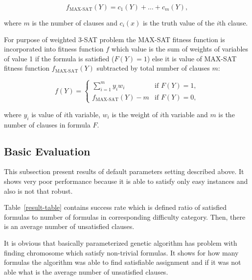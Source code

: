 \documentclass{article}
\begin{document}
$$f_{\text{MAX-SAT}}(Y) = c_1(Y) + \dots + c_m(Y),$$

where $m$ is the number of clauses and $c_i(x)$ is the truth value of the $i$th
clause.

For purpose of weighted 3-SAT problem the MAX-SAT fitness function is
incorporated into fitness function $f$
which value is the sum of weights of variables of value 1
if the formula is satisfied ($F(Y) = 1$)
else it is value of MAX-SAT fitness function $f_{\text{MAX-SAT}}(Y)$
subtracted by total number of clauses $m$:

$$
f(Y) = 
\begin{cases} 
    \sum_{i = 1}^m y_i w_i & \text{if } F(Y) = 1, \\
    f_{\text{MAX-SAT}}(Y) - m & \text{if } F(Y) = 0,
\end{cases}
$$

where $y_i$ is value of $i$th variable, $w_i$ is the weight of $i$th
variable and $m$ is the number of clauses in formula $F$.

\subsection{Basic Evaluation}
\label{sec:basic}

This subsection present results of default parameters setting described above.
It shows very poor performance
because it is able to satisfy only easy instances
and also is not that robust.

Table~\ref{result-table} contains success rate which is defined ratio
of satisfied formulas to number of formulas
in corresponding difficulty category.
Then, there is an average number of unsatisfied clauses.

It is obvious that basically parameterized genetic algorithm has problem
with finding chromosome which satisfy non-trivial formulas.
It shows for how many formulas the algorithm was able to find satisfiable
assignment and if it was not able what is the average number of unsatisfied
clauses.
\end{document}

